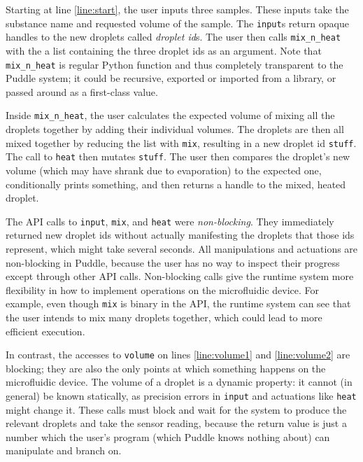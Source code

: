 \documentclass{jpaper}
\newcommand\pavel[1]{\todo[color=blue!60]{\sf #1}}
\begin{document}
Starting at line \ref{line:start}, the user inputs three samples.
These inputs take the substance name and requested volume of the sample.
The \lstinline{input}s return opaque handles to the new droplets called \emph{droplet id}s.
The user then calls \lstinline{mix_n_heat} with the a list containing the three droplet ids as an argument.
Note that \lstinline{mix_n_heat} is regular Python function and thus completely transparent to the Puddle system; it could be recursive, exported or imported from a library, or passed around as a first-class value.

Inside \lstinline{mix_n_heat}, the user calculates the expected volume of mixing all the droplets together by adding their individual volumes.
The droplets are then all mixed together by reducing the list with \lstinline{mix}, resulting in a new droplet id \lstinline{stuff}.
The call to \lstinline{heat} then mutates \lstinline{stuff}.
The user then compares the droplet's new volume (which may have shrank due to evaporation) to the expected one, conditionally prints something, and then returns a handle to the mixed, heated droplet.

The API calls to \lstinline{input}, \lstinline{mix}, and \lstinline{heat} were \emph{non-blocking}.
They immediately returned new droplet ids without actually manifesting the droplets that those ids represent, which might take several seconds.
All manipulations and actuations are non-blocking in Puddle, because the user has no way to inspect their progress except through other API calls.
Non-blocking calls give the runtime system more flexibility in how to implement operations on the microfluidic device.
For example, even though \lstinline{mix} is binary in the API, the runtime system can see that the user intends to mix many droplets together, which could lead to more efficient execution.

In contrast, the accesses to \lstinline{volume} on lines \ref{line:volume1} and \ref{line:volume2} are blocking; they are also the only points at which something happens on the microfluidic device.
The volume of a droplet is a dynamic property: it cannot (in general) be known statically, as precision errors in \lstinline{input} and actuations like \lstinline{heat} might change it.
These calls must block and wait for the system to produce the relevant droplets and take the sensor reading, because the return value is just a number which the user's program (which Puddle knows nothing about) can manipulate and branch on.
\pavel{mention error correction here}
\end{document}
